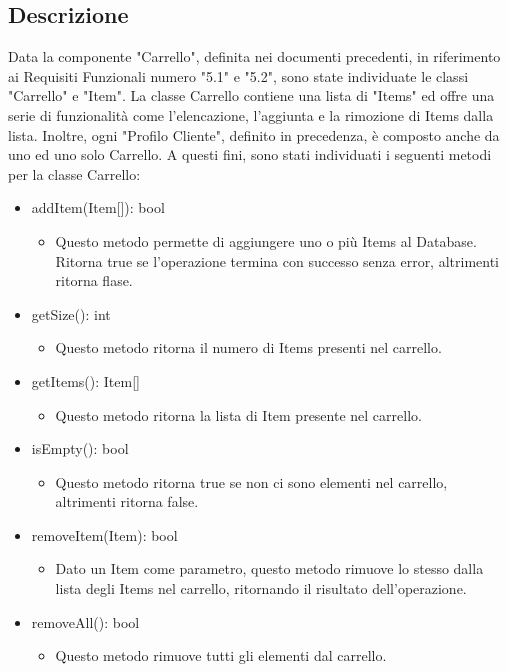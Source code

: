 \documentclass{report}
\begin{document}
\subsection*{Descrizione}
Data la componente "Carrello", definita nei documenti precedenti, in riferimento ai Requisiti Funzionali numero "5.1" e "5.2", sono state individuate le classi "Carrello" e "Item". La classe Carrello contiene una lista di "Items" ed offre una serie di funzionalità come l'elencazione, l'aggiunta e la rimozione di Items dalla lista. Inoltre, ogni "Profilo Cliente", definito in precedenza, è composto anche da uno ed uno solo Carrello. A questi fini, sono stati individuati i seguenti metodi per la classe Carrello:

\begin{itemize}
\item addItem(Item[]): bool
\begin{itemize}
	\item Questo metodo permette di aggiungere uno o più Items al Database. Ritorna true se l'operazione termina con successo senza error, altrimenti ritorna flase.
\end{itemize}

\item getSize(): int
\begin{itemize}
	\item Questo metodo ritorna il numero di Items presenti nel carrello.
\end{itemize}

\item getItems(): Item[]
\begin{itemize}
	\item Questo metodo ritorna la lista di Item presente nel carrello.
\end{itemize}

\item isEmpty(): bool
\begin{itemize}
	\item Questo metodo ritorna true se non ci sono elementi nel carrello, altrimenti ritorna false.
\end{itemize}

\item removeItem(Item): bool
\begin{itemize}
	\item Dato un Item come parametro, questo metodo rimuove lo stesso dalla lista degli Items nel carrello, ritornando il risultato dell'operazione.
\end{itemize}

\item removeAll(): bool
\begin{itemize}
	\item Questo metodo rimuove tutti gli elementi dal carrello.
\end{itemize}


\end{itemize}
\end{document}
